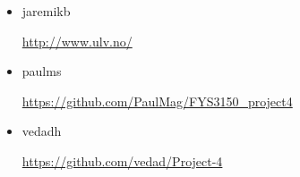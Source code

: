 \begin{itemize}
    \item jaremikb

        \url{http://www.ulv.no/}
        
    \item paulms

        \url{https://github.com/PaulMag/FYS3150_project4}
        
    \item vedadh

        \url{https://github.com/vedad/Project-4}

\end{itemize}
